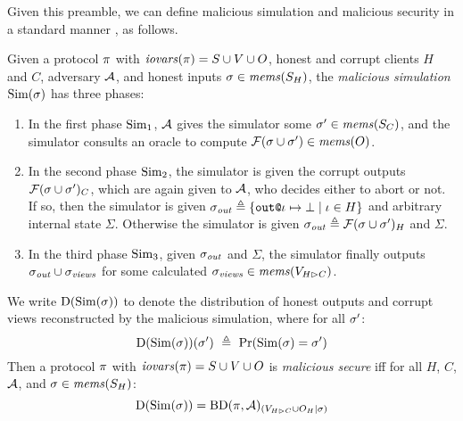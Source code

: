 Given this preamble, we can define malicious simulation and malicious security
in a standard manner \cite{evans2018pragmatic}, as follows.
\begin{definition}
  Given a protocol $\pi$ with $\mathit{iovars}(\pi) = S \cup V \cup O$, honest and corrupt 
  clients $H$ and $C$, adversary $\mathcal{A}$, and honest inputs
  $\sigma \in \mathit{mems}(S_H)$, the \emph{malicious simulation}  $\mathrm{Sim}(\sigma)$ has three phases:
  \begin{enumerate}
  \item In the first phase $\mathrm{Sim}_1$, $\mathcal{A}$ gives the
    simulator some $\sigma' \in \mathit{mems}(S_C)$, and the simulator consults an
    oracle to compute $\mathcal{F}(\sigma \cup \sigma') \in \mathit{mems}(O)$.
  \item In the second phase $\mathrm{Sim}_2$, the simulator is given the corrupt
    outputs $\mathcal{F}(\sigma \cup \sigma')_C$, which are again given to
    $\mathcal{A}$, who decides either to abort or not. If so, then the
    simulator is given $\sigma_{\mathit{out}} \triangleq \{ \texttt{out}\texttt{@}\iota \mapsto \bot \mid \iota \in H \}$
    and arbitrary internal state $\Sigma$.
    Otherwise the simulator is given $\sigma_{\mathit{out}} \triangleq \mathcal{F}(\sigma \cup \sigma')_H$
    and $\Sigma$.
  \item In the third phase $\mathrm{Sim}_3$, given $\sigma_{\mathit{out}}$ and $\Sigma$, the simulator
    finally outputs
    $\sigma_{\mathit{out}} \cup \sigma_{\mathit{views}}$ for some
    calculated $\sigma_{\mathit{views}} \in \mathit{mems}(V_{H \rhd C})$.
  \end{enumerate}
\end{definition}

\begin{definition}
  We write $\mathrm{D}(\mathrm{Sim}(\sigma))$ to
  denote the distribution of honest outputs and corrupt views reconstructed by the
  malicious simulation, where for
  all $\sigma'$:
  $$
  \dist(\SIM(\store))(\store')\ \defeq\ \prob(\SIM(\store) = \store') 
  $$
  Then a protocol $\pi$ with $\mathit{iovars}(\pi) = S \cup V \cup O$ is \emph{malicious
  secure} iff for all $H$, $C$, $\mathcal{A}$, and $\sigma \in \mathit{mems}(S_H)$:
  $$
  \mathrm{D}(\mathrm{Sim}(\sigma)) = \mathrm{BD}(\pi,\mathcal{A})_{({V_{H \rhd C} \cup O_H}|{\sigma})}
  $$  
\end{definition}
